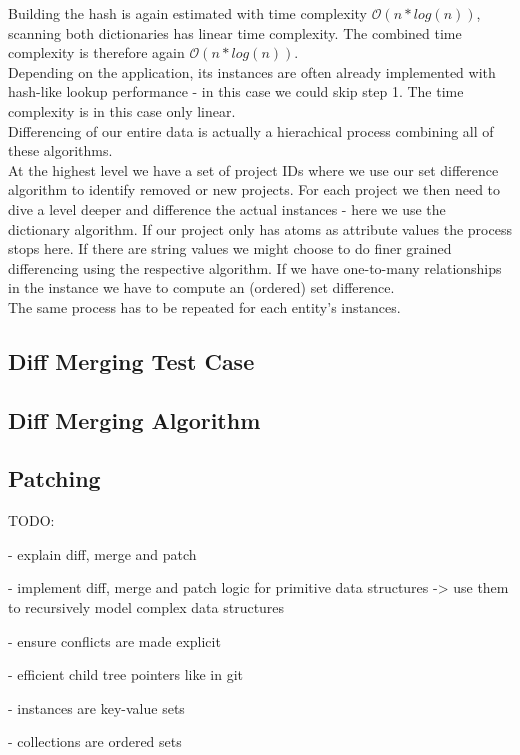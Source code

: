 Building the hash is again estimated with time complexity $ \mathcal O(n * log(n)) $, scanning both dictionaries has linear time complexity. The combined time complexity is therefore again $ \mathcal O(n * log(n)) $.\\
Depending on the application, its instances are often already implemented with hash-like lookup performance - in this case we could skip step 1.
The time complexity is in this case only linear.\\

Differencing of our entire data is actually a hierachical process combining all of these algorithms.\\
At the highest level we have a set of project IDs where we use our set difference algorithm to identify removed or new projects.
For each project we then need to dive a level deeper and difference the actual instances - here we use the dictionary algorithm.
If our project only has atoms as attribute values the process stops here.
If there are string values we might choose to do finer grained differencing using the respective algorithm.
If we have one-to-many relationships in the instance we have to compute an (ordered) set difference.\\
The same process has to be repeated for each entity's instances.

\subsection{Diff Merging Test Case}

\subsection{Diff Merging Algorithm}

\subsection{Patching}

TODO:

- explain diff, merge and patch

- implement diff, merge and patch logic for primitive data structures
  -> use them to recursively model complex data structures

- ensure conflicts are made explicit

- efficient child tree pointers like in git

- instances are key-value sets

- collections are ordered sets


